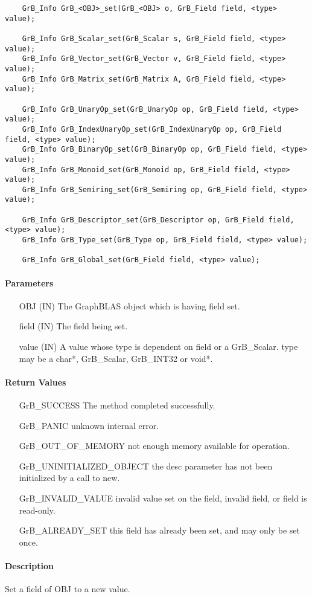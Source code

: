 \begin{verbatim}
    GrB_Info GrB_<OBJ>_set(GrB_<OBJ> o, GrB_Field field, <type> value);

    GrB_Info GrB_Scalar_set(GrB_Scalar s, GrB_Field field, <type> value);
    GrB_Info GrB_Vector_set(GrB_Vector v, GrB_Field field, <type> value);
    GrB_Info GrB_Matrix_set(GrB_Matrix A, GrB_Field field, <type> value);

    GrB_Info GrB_UnaryOp_set(GrB_UnaryOp op, GrB_Field field, <type> value);
    GrB_Info GrB_IndexUnaryOp_set(GrB_IndexUnaryOp op, GrB_Field field, <type> value);
    GrB_Info GrB_BinaryOp_set(GrB_BinaryOp op, GrB_Field field, <type> value);
    GrB_Info GrB_Monoid_set(GrB_Monoid op, GrB_Field field, <type> value);
    GrB_Info GrB_Semiring_set(GrB_Semiring op, GrB_Field field, <type> value);

    GrB_Info GrB_Descriptor_set(GrB_Descriptor op, GrB_Field field, <type> value);
    GrB_Info GrB_Type_set(GrB_Type op, GrB_Field field, <type> value);

    GrB_Info GrB_Global_set(GrB_Field field, <type> value);
\end{verbatim}

\paragraph{Parameters}

\begin{itemize}[leftmargin=2.1in]
    \item[{\sf OBJ}] ({\sf IN}) The GraphBLAS object which is having {\sf field} set.
    \item[{\sf field}] ({\sf IN}) The field being set.
    \item[{\sf value}] ({\sf IN}) A value whose type is dependent on {\sf field} or a {\sf GrB\_Scalar}.
                                {\sf type} may be a {\sf char*}, {\sf GrB\_Scalar}, {\sf GrB\_INT32} or {\sf void*}.
\end{itemize}

\paragraph{Return Values}

\begin{itemize}[leftmargin=2.1in]
    \item[{\sf GrB\_SUCCESS}]  The method completed successfully.
    \item[{\sf GrB\_PANIC}]             unknown internal error.
    \item[{\sf GrB\_OUT\_OF\_MEMORY}]          not enough memory available for operation.
    \item[{\sf GrB\_UNINITIALIZED\_OBJECT}]          the {\sf desc} parameter has not been
                                        initialized by a call to {\sf new}.
    \item[{\sf GrB\_INVALID\_VALUE}]    invalid value set on the field, invalid field, or field is read-only.
    \item[{\sf GrB\_ALREADY\_SET}]  this field has already been set, and may only be set once. 
    \end{itemize}

\paragraph{Description}

Set a field of {\sf OBJ} to a new value. 